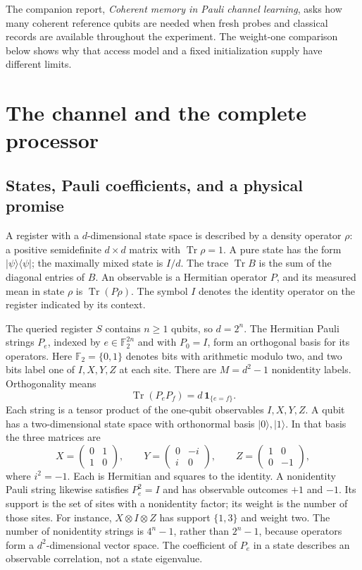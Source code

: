 \documentclass[11pt,a4paper]{article}
\numberwithin{equation}{section}
\theoremstyle{definition}
\theoremstyle{remark}
\DeclareMathOperator{\Tr}{Tr}
\begin{document}
The companion report, \emph{Coherent memory in Pauli channel learning}, asks how
many coherent reference qubits are needed when fresh probes and classical
records are available throughout the experiment. The weight-one comparison
below shows why that access model and a fixed initialization supply have
different limits.

\section{The channel and the complete processor}

\subsection{States, Pauli coefficients, and a physical promise}

A register with a $d$-dimensional state space is described by a density operator
$\rho$: a positive semidefinite $d\times d$ matrix with $\Tr\rho=1$. A pure state
has the form $|\psi\rangle\langle\psi|$; the maximally mixed state is $I/d$.
The trace $\Tr B$ is the sum of the diagonal entries of $B$.
An observable is a Hermitian operator $P$, and its measured mean in state
$\rho$ is $\Tr(P\rho)$.
The symbol $I$ denotes the identity operator on the register indicated by its
context.

The queried register $S$ contains $n\geq1$ qubits, so $d=2^n$. The Hermitian
Pauli strings $P_e$, indexed by $e\in\mathbb F_2^{2n}$ and with $P_0=I$,
form an orthogonal basis for its operators. Here $\mathbb F_2=\{0,1\}$
denotes bits with arithmetic modulo two, and two bits label one of $I,X,Y,Z$
at each site. There are $M=d^2-1$ nonidentity labels. Orthogonality means
\begin{equation}
 \Tr(P_eP_f)=d\,\mathbf 1_{\{e=f\}}.
 \label{q:pauli-orthogonal}
\end{equation}
Each string is a tensor product of the one-qubit observables $I,X,Y,Z$.
A qubit has a two-dimensional state space with orthonormal basis
$|0\rangle,|1\rangle$. In that basis the three matrices are
\[
 X=\begin{pmatrix}0&1\\1&0\end{pmatrix},\qquad
 Y=\begin{pmatrix}0&-i\\i&0\end{pmatrix},\qquad
 Z=\begin{pmatrix}1&0\\0&-1\end{pmatrix},
\]
where $i^2=-1$. Each is Hermitian and squares to the identity. A nonidentity
Pauli string likewise satisfies $P_e^2=I$ and has observable outcomes
$+1$ and $-1$. Its support is the set of sites with a nonidentity factor;
its weight is the number of those sites. For instance,
$X\otimes I\otimes Z$ has support $\{1,3\}$ and weight two.
The number of nonidentity strings is $4^n-1$, rather than $2^n-1$, because
operators form a $d^2$-dimensional vector space. The coefficient of $P_e$ in a
state describes an observable correlation, not a state eigenvalue.
\end{document}
